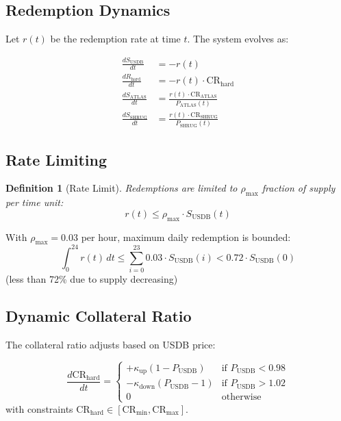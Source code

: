 \documentclass[11pt,a4paper]{article}
\newtheorem{definition}[theorem]{Definition}
\begin{document}
\subsection{Redemption Dynamics}

Let $r(t)$ be the redemption rate at time $t$. The system evolves as:

\begin{align}
\frac{dS_{\text{USDB}}}{dt} &= -r(t) \\
\frac{dR_{\text{hard}}}{dt} &= -r(t) \cdot \text{CR}_{\text{hard}} \\
\frac{dS_{\text{ATLAS}}}{dt} &= \frac{r(t) \cdot \text{CR}_{\text{ATLAS}}}{P_{\text{ATLAS}}(t)} \\
\frac{dS_{\text{SHRUG}}}{dt} &= \frac{r(t) \cdot \text{CR}_{\text{SHRUG}}}{P_{\text{SHRUG}}(t)}
\end{align}

\subsection{Rate Limiting}

\begin{definition}[Rate Limit]
Redemptions are limited to $\rho_{\max}$ fraction of supply per time unit:
\begin{equation}
r(t) \leq \rho_{\max} \cdot S_{\text{USDB}}(t)
\end{equation}
\end{definition}

With $\rho_{\max} = 0.03$ per hour, maximum daily redemption is bounded:
\begin{equation}
\int_0^{24} r(t)\, dt \leq \sum_{i=0}^{23} 0.03 \cdot S_{\text{USDB}}(i) < 0.72 \cdot S_{\text{USDB}}(0)
\end{equation}
(less than 72\% due to supply decreasing)

\subsection{Dynamic Collateral Ratio}

The collateral ratio adjusts based on USDB price:

\begin{equation}
\frac{d\text{CR}_{\text{hard}}}{dt} = \begin{cases}
+\kappa_{\text{up}}(1 - P_{\text{USDB}}) & \text{if } P_{\text{USDB}} < 0.98 \\
-\kappa_{\text{down}}(P_{\text{USDB}} - 1) & \text{if } P_{\text{USDB}} > 1.02 \\
0 & \text{otherwise}
\end{cases}
\end{equation}
with constraints $\text{CR}_{\text{hard}} \in [\text{CR}_{\min}, \text{CR}_{\max}]$.
\end{document}
